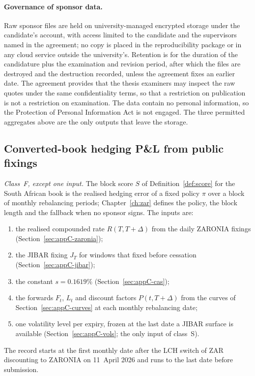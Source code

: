 \paragraph{Governance of sponsor data.} Raw sponsor files are held on university-managed encrypted storage under the candidate's account, with access limited to the candidate and the supervisors named in the agreement; no copy is placed in the reproducibility package or in any cloud service outside the university's. Retention is for the duration of the candidature plus the examination and revision period, after which the files are destroyed and the destruction recorded, unless the agreement fixes an earlier date. The agreement provides that the thesis examiners may inspect the raw quotes under the same confidentiality terms, so that a restriction on publication is not a restriction on examination. The data contain no personal information, so the Protection of Personal Information Act is not engaged. The three permitted aggregates above are the only outputs that leave the storage.


\subsection{Converted-book hedging P\&L from public fixings}\label{sec:appC-pnl}

\emph{Class~F, except one input.} The block score $S$ of Definition~\ref{def:score} for the South African book is the realised hedging error of a fixed policy $\pi$ over a block of monthly rebalancing periods; Chapter~\ref{ch:zar} defines the policy, the block length and the fallback when no sponsor signs. The inputs are:
\begin{enumerate}[nosep]
\item the realised compounded rate $R(T,T+\Delta)$ from the daily ZARONIA fixings (Section~\ref{sec:appC-zaronia});
\item the JIBAR fixing $J_T$ for windows that fixed before cessation (Section~\ref{sec:appC-jibar});
\item the constant $s=0.1619\%$ (Section~\ref{sec:appC-cas});
\item the forwards $F_t$, $L_t$ and discount factors $P(t,T+\Delta)$ from the curves of Section~\ref{sec:appC-curves} at each monthly rebalancing date;
\item one volatility level per expiry, frozen at the last date a JIBAR surface is available (Section~\ref{sec:appC-vols}; the only input of class~S).
\end{enumerate}
The record starts at the first monthly date after the LCH switch of ZAR discounting to ZARONIA on 11~April 2026 and runs to the last date before submission.

